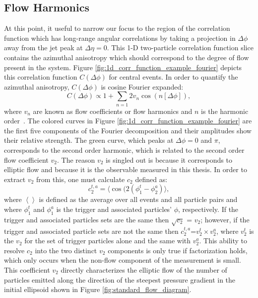 \subsection{Flow Harmonics}
At this point, it useful to narrow our focus to the region of the correlation function which has long-range angular correlations by taking a projection in $\Delta\phi$ away from the jet peak at $\Delta\eta = 0$. This 1-D two-particle correlation function slice contains the azimuthal anisotropy which should correspond to the degree of flow present in the system. Figure \ref{fig:1d_corr_function_example_fourier} depicts this correlation function $C(\Delta\phi)$ for central \pbpb events. In order to quantify the azimuthal anisotropy, $C(\Delta\phi)$ is cosine Fourier expanded:
\begin{equation}\label{eqn:dndphi}
  C(\Delta\phi) \propto 1 + \sum_{n=1}2 v_{n}\cos(n[\Delta\phi]),
\end{equation}
where $v_n$ are known as flow coefficients or flow harmonics and $n$ is the harmonic order~\cite{Voloshin1996}. The colored curves in Figure \ref{fig:1d_corr_function_example_fourier} are the first five components of the Fourier decomposition and their amplitudes show their relative strength. The green curve, which peaks at $\Delta\phi = 0$ and $\pi$, corresponds to the second order harmonic, which is related to the second order flow coefficient $v_2$. The reason $v_2$ is singled out is because it corresponds to elliptic flow and because it is the observable measured in this thesis. In order to extract $v_2$ from this, one must calculate $c_2$ defined as:
\begin{equation}
  c_2^{t,a} = \langle\cos(2(\phi_1^t-\phi_2^a)\rangle,
\end{equation}
where $\left<\right>$ is defined as the average over all events  and all particle pairs and where $\phi_1^t$ and $\phi_1^a$ is the trigger and associated particles' $\phi$, respectively. If the trigger and associated particles sets are the same then $\sqrt{c_2}$ = $v_2$; however, if the trigger and associated particle sets are not the same then $c_2^{t,a} $=$v_2^{t}\times v_2^{a}$, where $v_2^{t}$ is the $v_2$ for the set of trigger particles alone and the same with $v_2^a$. This ability to resolve $c_2$ into the two distinct $v_2$ components is only true if factorization holds, which only occurs when the non-flow component of the measurement is small. This coefficient $v_2$ directly characterizes the elliptic flow of the number of particles emitted along the direction of the steepest pressure gradient in the initial ellipsoid shown in Figure \ref{fig:standard_flow_diagram}.
